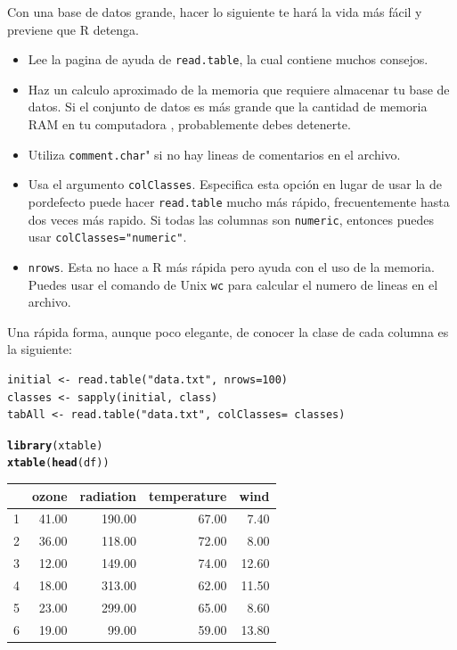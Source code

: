 \documentclass[spanish, letterpaper,12]{article}\usepackage[]{graphicx}\usepackage[]{xcolor}
\makeatletter
\newcommand{\hldef}[1]{\textcolor[rgb]{0.345,0.345,0.345}{#1}}%
\newcommand{\hlkwd}[1]{\textcolor[rgb]{0.737,0.353,0.396}{\textbf{#1}}}%
\newenvironment{kframe}{%
 \def\at@end@of@kframe{}%
 \ifinner\ifhmode%
  \def\at@end@of@kframe{\end{minipage}}%
  \begin{minipage}{\columnwidth}%
 \fi\fi%
 \def\FrameCommand##1{\hskip\@totalleftmargin \hskip-\fboxsep
 \colorbox{shadecolor}{##1}\hskip-\fboxsep
     \hskip-\linewidth \hskip-\@totalleftmargin \hskip\columnwidth}%
 \MakeFramed {\advance\hsize-\width
   \@totalleftmargin\z@ \linewidth\hsize
   \@setminipage}}%
 {\par\unskip\endMakeFramed%
 \at@end@of@kframe}
\makeatother
\begin{document}
Con una base de datos grande, hacer lo siguiente te hará la vida más fácil y previene que R detenga.
\begin{itemize}
 \item Lee la pagina de ayuda de \verb=read.table=, la cual contiene muchos consejos.
 \item Haz un calculo aproximado de la memoria que requiere almacenar tu base de datos. Si el conjunto de datos es más grande que la cantidad de memoria RAM en tu computadora , probablemente debes detenerte.
 \item Utiliza \verb=comment.char=" si no hay lineas de comentarios en el archivo.
 \item Usa el argumento \verb=colClasses=. Especifica esta opción en lugar de usar la de pordefecto puede hacer \verb=read.table= mucho más rápido, frecuentemente hasta dos veces más rapido. Si todas las columnas son \verb=numeric=, entonces puedes usar \verb$colClasses="numeric"$.
 \item \verb=nrows=. Esta no hace a R más rápida pero ayuda con el uso de la memoria. Puedes usar el comando de Unix \verb=wc= para calcular el numero de lineas en el archivo. 
\end{itemize}


Una rápida forma, aunque poco elegante, de conocer la clase de cada columna es la siguiente:
\begin{verbatim}
initial <- read.table("data.txt", nrows=100)
classes <- sapply(initial, class)
tabAll <- read.table("data.txt", colClasses= classes)
\end{verbatim}



\begin{kframe}
\begin{alltt}
  \hlkwd{library}\hldef{(xtable)}
  \hlkwd{xtable}\hldef{(}\hlkwd{head}\hldef{(df))}
\end{alltt}
\end{kframe}%
\begin{table}[ht]
\centering
\begin{tabular}{rrrrr}
  \hline
 & ozone & radiation & temperature & wind \\ 
  \hline
1 & 41.00 & 190.00 & 67.00 & 7.40 \\ 
  2 & 36.00 & 118.00 & 72.00 & 8.00 \\ 
  3 & 12.00 & 149.00 & 74.00 & 12.60 \\ 
  4 & 18.00 & 313.00 & 62.00 & 11.50 \\ 
  5 & 23.00 & 299.00 & 65.00 & 8.60 \\ 
  6 & 19.00 & 99.00 & 59.00 & 13.80 \\ 
   \hline
\end{tabular}
\end{table}
\end{document}
